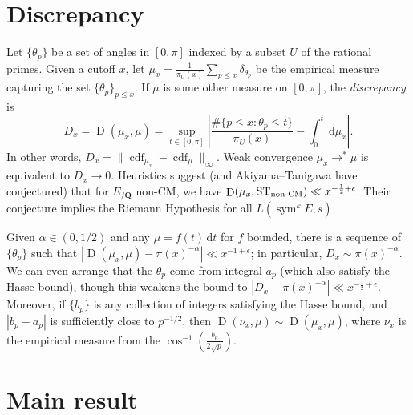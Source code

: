 \documentclass{article}
\DeclareMathOperator{\cdf}{cdf}
\DeclareMathOperator{\D}{D}
\DeclareMathOperator{\sym}{sym}
\newcommand{\bQ}{\mathbf{Q}}
\newcommand{\dd}{\mathrm{d}}
\newcommand{\nonCM}{\textnormal{non-CM}}
\newcommand{\ST}{\mathrm{ST}}
\begin{document}
\section{Discrepancy}

Let $\{\theta_p\}$ be a set of angles in $[0,\pi]$ indexed by a subset $U$ of 
the rational primes. Given a cutoff $x$, let 
$\mu_x = \frac{1}{\pi_U(x)}\sum_{p\leqslant x} \delta_{\theta_p}$ be the 
empirical measure capturing the set $\{\theta_p\}_{p\leqslant x}$. If $\mu$ is 
some other measure on $[0,\pi]$, the \emph{discrepancy} is 
\[
	D_x = \D(\mu_x,\mu) = \sup_{t\in [0,\pi]} \left| \frac{\#\{p\leqslant x : \theta_p \leqslant t\}}{\pi_U(x)} - \int_0^t \, \dd \mu_x\right| .
\]
In other words, $D_x = \|\cdf_{\mu_x} - \cdf_\mu\|_\infty$. Weak convergence 
$\mu_x \to^\ast \mu$ is equivalent to $D_x \to 0$. Heuristics suggest (and 
Akiyama--Tanigawa have conjectured) that for $E_{/\bQ}$ non-CM, we have 
$\D(\mu_x,\ST_\nonCM) \ll x^{-\frac 1 2+\epsilon}$. Their conjecture implies 
the Riemann Hypothesis for all $L(\sym^k E,s)$. 

Given $\alpha\in (0,1/2)$ and any $\mu = f(t)\, \dd t$ for $f$ bounded, there 
is a sequence of $\{\theta_p\}$ such that 
$|\D(\mu_x,\mu) - \pi(x)^{-\alpha}| \ll x^{-1+\epsilon}$; in particular, 
$D_x \sim \pi(x)^{-\alpha}$. We can even arrange that the $\theta_p$ come 
from integral $a_p$ (which also satisfy the Hasse bound), though this weakens 
the bound to $|D_x - \pi(x)^{-\alpha}| \ll x^{-\frac 1 2+\epsilon}$. Moreover, 
if $\{b_p\}$ is any collection of integers satisfying the Hasse bound, and 
$|b_p - a_p|$ is sufficiently close to $p^{-1/2}$, then 
$\D(\nu_x,\mu) \sim \D(\mu_x,\mu)$, where $\nu_x$ is the empirical measure from 
the $\cos^{-1}\left(\frac{b_p}{2\sqrt p}\right)$. 





\section{Main result}
\end{document}
